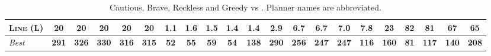 \documentclass[11pt,landscape]{article}
\begin{document}
\begin{table}[tb]
{\begin{tabular}{|l||ccccc||ccccc||ccccc||ccccc||}
\textsc{Line} (L)&\textbf{20}&\textbf{20}&\textbf{20}&\textbf{20}&\textbf{20}&\textbf{1.1}&1.6&1.5&1.4&1.4&\textbf{2.9}&6.7&6.7&7.0&7.8&\textbf{23}&82&81&67&65
\\\hline
\textit{Best}&\textbf{291}&\textbf{326}&\textbf{330}&\textbf{316}&\textbf{315}&\textbf{52}&\textbf{55}&\textbf{59}&\textbf{54}&\textbf{138}&\textbf{290}&\textbf{256}&\textbf{247}&\textbf{247}&\textbf{116}&\textbf{160}&\textbf{81}&\textbf{117}&\textbf{140}&\textbf{208}\\\hline

        \end{tabular}}
        \caption{Cautious, Brave, Reckless and Greedy \pattyd vs \pattyo. Planner names are abbreviated.}
        \label{tab:cbrg}
        \end{table}
        
\end{document}
